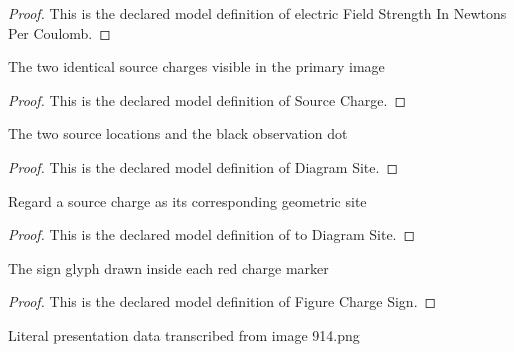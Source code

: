 \begin{proof}
  This is the declared model definition of electric Field Strength In Newtons Per Coulomb.
\end{proof}
\begin{definition}
  \label{def:physics:phyx-mini-0914:phyxminiproblems-problemphyxmini0914-sourcecharge}
  The two identical source charges visible in the primary image
\end{definition}
\begin{proof}
  This is the declared model definition of Source Charge.
\end{proof}
\begin{definition}
  \label{def:physics:phyx-mini-0914:phyxminiproblems-problemphyxmini0914-diagramsite}
  The two source locations and the black observation dot
\end{definition}
\begin{proof}
  This is the declared model definition of Diagram Site.
\end{proof}
\begin{definition}
  \label{def:physics:phyx-mini-0914:phyxminiproblems-problemphyxmini0914-sourcecharge-todiagramsite}
  Regard a source charge as its corresponding geometric site
\end{definition}
\begin{proof}
  This is the declared model definition of to Diagram Site.
\end{proof}
\begin{definition}
  \label{def:physics:phyx-mini-0914:phyxminiproblems-problemphyxmini0914-figurechargesign}
  The sign glyph drawn inside each red charge marker
\end{definition}
\begin{proof}
  This is the declared model definition of Figure Charge Sign.
\end{proof}
\begin{definition}
  \label{def:physics:phyx-mini-0914:phyxminiproblems-problemphyxmini0914-twochargefieldfigure}
  Literal presentation data transcribed from image 914.png
\end{definition}
